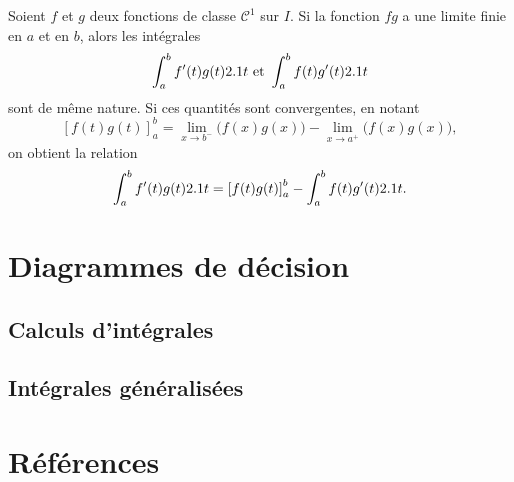 \begin{subappendices}

\printindex[theoremesutilises]

\begin{theo}
\label{theo:approximationescalier}
\end{theo}

\begin{theo}\label{theo:ippgeneralisees}
    Soient $f$ et $g$ deux fonctions de classe $\mathscr{C}^1$ sur $I$. Si la fonction $fg$ a une limite finie en $a$ et en $b$, alors les intégrales
    \[
    \int_a^b f'(t)g(t) 2.1 t \text{ et } \int_a^b f(t) g'(t) 2.1 t
    \]
    sont de même nature. Si ces quantités sont convergentes, en notant
    \[
        [f(t)g(t)]_a^b = \lim_{x \to b^-} \big(f(x)g(x)\big) - \lim_{x \to a^+} \big(f(x)g(x)\big),
    \]
    on obtient la relation
    \[
    \int_a^b f'(t) g(t) 2.1 t = \left[f(t)g(t)\right]_a^b - \int_a^b f(t) g'(t) 2.1 t.
    \]
\end{theo}


\section{Diagrammes de décision}

\subsection{Calculs d'intégrales}

\subsection{Intégrales généralisées}




\section{Références}


\end{subappendices}
